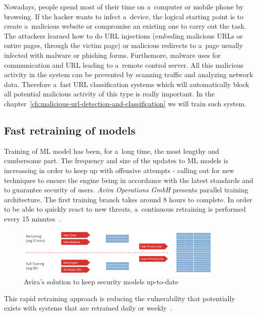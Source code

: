 Nowadays, people spend most of their time on a~computer or mobile phone by browsing.
If the hacker wants to infect a~device, the logical starting point is to create a~malicious website or compromise an existing one to carry out the task.
The attackers learned how to do URL injections (embeding malicious URLs or entire pages, through the victim page) or malicious redirects to a~page usually infected with malware or phishing forms.
Furthemore, malware uses for communication and URL leading to a~remote control server.
All this malicious activity in the system can be prevented by scanning traffic and analyzing network data.
Therefore a~fast URL classification systems which will automatically block all potential malicious activity of this type is really important.
In the chapter~\ref{ch:malicious-url-detection-and-classification} we will train such system.

\subsection{Fast retraining of models}\label{subsec:fast-retraining-of-models}

Training of ML model has been, for a~long time, the most lengthy and cumbersome part.
The frequency and size of the updates to ML models is increassing in order to keep up with offensive attempts - calling out for new techniques to ensure the engine being in accordance with the latest standards and to guarantee security of users.
\textit{Avira Operations GmbH} presents parallel training architecture.
The first training branch takes around 8 hours to complete.
In order to be able to quickly react to new threats, a~continuous retraining is performed every 15 minutes~\cite{whitepaper:avira_nightvision}.

\begin{figure}[htb]
    \centering
    \includegraphics[width=0.9\textwidth]{imgs/avira_training.png}
    \caption{Avira's solution to keep security models up-to-date~\cite{whitepaper:avira_nightvision}}
    \label{fig:avira_training}
\end{figure}
\FloatBarrier

This rapid retraining approach is reducing the vulnerability that potentially exists with systems that are retrained daily or weekly~\cite{whitepaper:avira_nightvision}.

